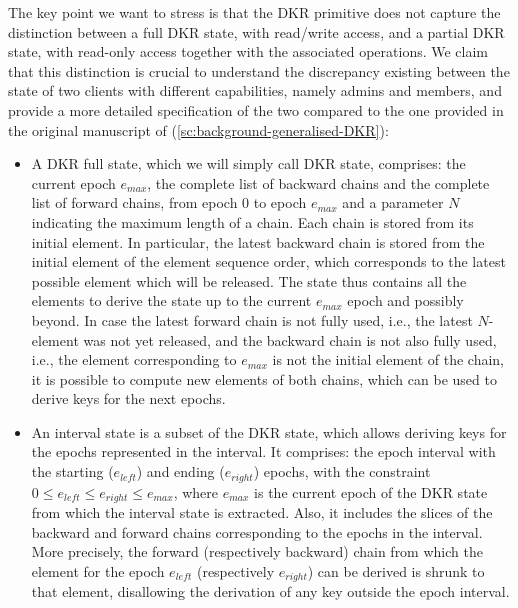The key point we want to stress is that the DKR primitive
does not capture the distinction between a full DKR state,
with read/write access, and a partial DKR state, with read-only access
together with the associated operations.
We claim that this distinction is crucial to understand the discrepancy
existing between the state of two clients with different capabilities,
namely admins and members, and provide a more detailed specification
of the two compared to the one provided in the original manuscript of \cite{GKP} (\cref{sc:background-generalised-DKR}):

\begin{itemize}
    \item A DKR full state, which we will simply call DKR state,
    comprises: 
    the current epoch $e_{max}$, 
    the complete list of backward chains
    and the complete list of forward chains,
    from epoch $0$ to epoch $e_{max}$ and 
    a parameter $N$ indicating the maximum length of a chain.
    Each chain is stored from its initial element. 
    In particular, the latest backward chain
    is stored from the initial element of the element sequence order,
    which corresponds to the latest possible element which will be released.
    The state thus contains all the elements to derive the state up to
    the current $e_{max}$ epoch and possibly beyond. 
    In case the latest forward chain is not fully used, i.e.,
    the latest $N$-element was not yet released, and the backward
    chain is not also fully used, i.e., the element
    corresponding to $e_{max}$ is not the initial element of the chain,
    it is possible to compute new elements of both
    chains, which can be used to derive keys for the next epochs.
    \item An interval state is a subset of the DKR state, which
    allows deriving keys for the epochs represented in the interval.
    It comprises: the epoch interval with the starting ($e_{left}$) and ending ($e_{right}$) 
    epochs, with the constraint $0 \leq e_{left} \leq e_{right} \leq e_{max}$,
    where $e_{max}$ is the current epoch of the DKR state from which the interval
    state is extracted. Also, it includes the slices of the backward
    and forward chains corresponding to the epochs in the interval.
    More precisely, the forward (respectively backward) chain from which the
    element for the epoch $e_{left}$ (respectively $e_{right}$) can be derived
    is shrunk to that element, disallowing the derivation of any key outside the epoch interval.
\end{itemize}

